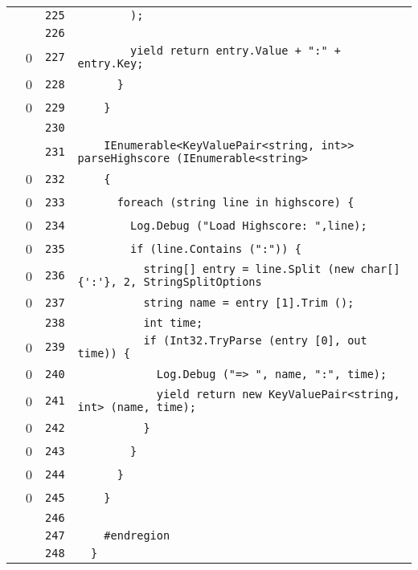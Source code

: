 \documentclass[a4paper,10pt]{article}
\begin{document}
\begin{longtable}[l]{lrrl}
\cellcolor{gray} &  & \verb~225~ & \verb~        );~\\
\cellcolor{gray} &  & \verb~226~ & \verb~~\\
\cellcolor{red} & 0 & \verb~227~ & \verb~        yield return entry.Value + ":" + entry.Key;~\\
\cellcolor{red} & 0 & \verb~228~ & \verb~      }~\\
\cellcolor{red} & 0 & \verb~229~ & \verb~    }~\\
\cellcolor{gray} &  & \verb~230~ & \verb~~\\
\cellcolor{gray} &  & \verb~231~ & \verb~    IEnumerable<KeyValuePair<string, int>> parseHighscore (IEnumerable<string>~\\
\cellcolor{red} & 0 & \verb~232~ & \verb~    {~\\
\cellcolor{red} & 0 & \verb~233~ & \verb~      foreach (string line in highscore) {~\\
\cellcolor{red} & 0 & \verb~234~ & \verb~        Log.Debug ("Load Highscore: ",line);~\\
\cellcolor{red} & 0 & \verb~235~ & \verb~        if (line.Contains (":")) {~\\
\cellcolor{red} & 0 & \verb~236~ & \verb~          string[] entry = line.Split (new char[] {':'}, 2, StringSplitOptions~\\
\cellcolor{red} & 0 & \verb~237~ & \verb~          string name = entry [1].Trim ();~\\
\cellcolor{gray} &  & \verb~238~ & \verb~          int time;~\\
\cellcolor{red} & 0 & \verb~239~ & \verb~          if (Int32.TryParse (entry [0], out time)) {~\\
\cellcolor{red} & 0 & \verb~240~ & \verb~            Log.Debug ("=> ", name, ":", time);~\\
\cellcolor{red} & 0 & \verb~241~ & \verb~            yield return new KeyValuePair<string, int> (name, time);~\\
\cellcolor{red} & 0 & \verb~242~ & \verb~          }~\\
\cellcolor{red} & 0 & \verb~243~ & \verb~        }~\\
\cellcolor{red} & 0 & \verb~244~ & \verb~      }~\\
\cellcolor{red} & 0 & \verb~245~ & \verb~    }~\\
\cellcolor{gray} &  & \verb~246~ & \verb~~\\
\cellcolor{gray} &  & \verb~247~ & \verb~    #endregion~\\
\cellcolor{gray} &  & \verb~248~ & \verb~  }~\\

\end{longtable}
\end{document}
